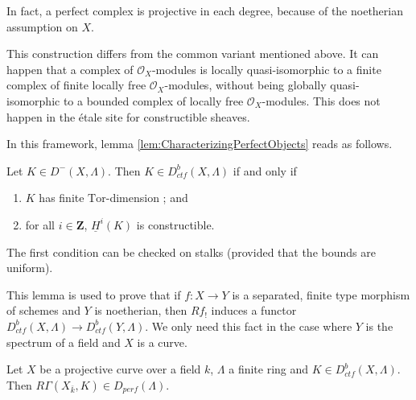 \begin{remark}
In fact, a perfect complex is projective in each degree, because of the noetherian assumption on $X$. 
\end{remark}

\begin{remark}
This construction differs from the common variant mentioned above. It can happen that a complex of $\mathcal{O}_X$-modules is locally quasi-isomorphic to a finite complex of finite locally free $\mathcal{O}_X$-modules, without being globally quasi-isomorphic to a bounded complex of locally free $\mathcal{O}_X$-modules. This does not happen in the \'etale site for constructible sheaves.
\end{remark}

In this framework, lemma \ref{lem:CharacterizingPerfectObjects} reads as follows.

\begin{lemma} 
Let $K\in D^-(X, \Lambda)$. Then $K\in D_{ctf}^b(X, \Lambda)$ if and only if 
\begin{enumerate}
\item
$K$ has finite $\text{Tor}$-dimension ; and
\item
for all $i \in \mathbf{Z}$, $\underline{H}^i(K)$ is constructible.
\end{enumerate} 
\end{lemma}

The first condition can be checked on stalks (provided that the bounds are uniform).

\begin{remark} 
This lemma is used to prove that if $f: X\to Y$ is a separated, finite type morphism of schemes and $Y$ is noetherian, then $Rf_!$ induces a functor $D_{ctf}^b(X, \Lambda) \to D_{ctf}^b (Y, \Lambda)$. We only need this fact in the case where $Y$ is the spectrum of a field and $X$ is a curve. 
\end{remark}

\begin{proposition}
Let $X$ be a projective curve over a field $k$, $\Lambda$ a finite ring and $K\in D_{ctf}^b (X, \Lambda)$. Then $R\Gamma(X_{\bar k}, K)\in D_{perf}(\Lambda)$.
\end{proposition}
	
